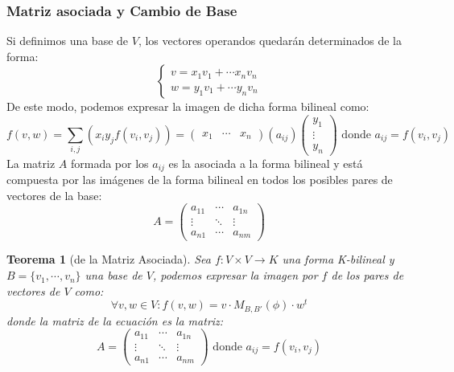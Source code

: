 \documentclass[10pt,a4paper,openright]{book}
\theoremstyle{break}
\newtheorem*{theo}{Teorema}
\begin{document}
\subsubsection{Matriz asociada y Cambio de Base}
Si definimos una base de $V$, los vectores operandos quedarán determinados de la forma:
$$\begin{cases}v=x_1v_1+\cdots x_nv_n \\ w=y_1v_1+\cdots y_nv_n\end{cases}$$
De este modo, podemos expresar la imagen de dicha forma bilineal como:
$$f(v,w)=\sum_{i,j} (x_iy_jf(v_i,v_j)) = \begin{pmatrix} x_1 & \cdots & x_n\end{pmatrix}(a_{ij})\begin{pmatrix} y_1 \\ \vdots \\ y_n \end{pmatrix} \mbox{ donde }a_{ij} = f(v_i, v_j)$$
La matriz $A$ formada por los $a_{ij}$ es la asociada a la forma bilineal y está compuesta por las imágenes de la forma bilineal en todos los posibles pares de vectores de la base:
$$A=\begin{pmatrix} a_{11} & \cdots & a_{1n} \\ \vdots & \ddots & \vdots \\ a_{n1} & \cdots & a_{nm} \end{pmatrix}$$

\begin{theo}[de la Matriz Asociada]
Sea $f: V\times V \longrightarrow K$ una forma K-bilineal y $B=\{v_1,\cdots, v_n\}$ una base de $V$, podemos expresar la imagen por $f$ de los pares de vectores de $V$ como:
$$\forall v, w\in V : f(v,w) = v\cdot M_{B,B'}(\phi) \cdot w^t$$
donde la matriz de la ecuación es la matriz:
$$A=\begin{pmatrix} a_{11} & \cdots & a_{1n} \\ \vdots & \ddots & \vdots \\ a_{n1} & \cdots & a_{nm} \end{pmatrix} \mbox{ donde } a_{ij} = f(v_i, v_j)$$
\end{theo}
\end{document}
